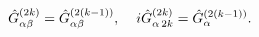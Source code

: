 \begin{equation}
\hat{G}_{\alpha\beta}^{(2k)}=
\hat{G}_{\alpha\beta}^{(2(k-1))}, 
\hspace{0.4cm}
i\hat{G}_{\alpha\hspace{0.05cm}2k}^{(2k)}
=\hat{G}_{\alpha}^{(2(k-1))}. 
\label{identify2kand2k-2}
\end{equation}

